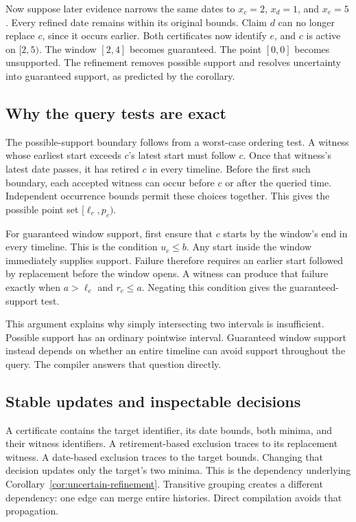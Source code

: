 Now suppose later evidence narrows the same dates to $x_c=2$, $x_d=1$, and $x_e=5$.
Every refined date remains within its original bounds.
Claim $d$ can no longer replace $c$, since it occurs earlier.
Both certificates now identify $e$, and $c$ is active on $[2,5)$.
The window $[2,4]$ becomes guaranteed.
The point $[0,0]$ becomes unsupported.
The refinement removes possible support and resolves uncertainty into guaranteed support, as predicted by the corollary.

\subsection{Why the query tests are exact}

The possible-support boundary follows from a worst-case ordering test.
A witness whose earliest start exceeds $c$'s latest start must follow $c$.
Once that witness's latest date passes, it has retired $c$ in every timeline.
Before the first such boundary, each accepted witness can occur before $c$ or after the queried time.
Independent occurrence bounds permit these choices together.
This gives the possible point set $[\ell_c,p_c)$.

For guaranteed window support, first ensure that $c$ starts by the window's end in every timeline.
This is the condition $u_c\leq b$.
Any start inside the window immediately supplies support.
Failure therefore requires an earlier start followed by replacement before the window opens.
A witness can produce that failure exactly when $a>\ell_c$ and $r_c\leq a$.
Negating this condition gives the guaranteed-support test.

This argument explains why simply intersecting two intervals is insufficient.
Possible support has an ordinary pointwise interval.
Guaranteed window support instead depends on whether an entire timeline can avoid support throughout the query.
The compiler answers that question directly.

\subsection{Stable updates and inspectable decisions}

A certificate contains the target identifier, its date bounds, both minima, and their witness identifiers.
A retirement-based exclusion traces to its replacement witness.
A date-based exclusion traces to the target bounds.
Changing that decision updates only the target's two minima.
This is the dependency underlying Corollary~\ref{cor:uncertain-refinement}.
Transitive grouping creates a different dependency: one edge can merge entire histories.
Direct compilation avoids that propagation.

